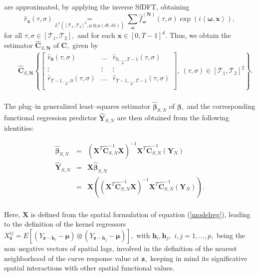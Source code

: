 \documentclass[11pt,a4paper]{article}
\begin{document}
\noindent are approximated, by applying  the inverse SfDFT, obtaining
\begin{equation}\label{Eq1b}
\widehat{r}_{\mathbf{x}}(\tau,\sigma)\underset{L^{2}\left([\mathcal{T}_{1},\mathcal{T}_{2}]^{2},\mu \otimes \mu(dt,ds)\right)}{=}  \sum_{\boldsymbol{\omega}} \widehat{f}_{\boldsymbol{\omega}}^{(\mathbf{N})}(\tau,\sigma) \exp\left(i\left\langle \boldsymbol{\omega}, \mathbf{x}\right\rangle \right),
\end{equation}
\noindent for  all $\tau,\sigma \in [\mathcal{T}_{1},\mathcal{T}_{2}],$ and for each  $\mathbf{x}\in [0,T-1]^{d}.$ Thus, we obtain the estimator  $\widehat{\mathbf{C}}_{S,\mathbf{N}}$ of $\mathbf{C},$  given by
\begin{eqnarray}
&& \widehat{\mathbf{C}}_{S,\mathbf{N}}\left\{\left[\begin{array}{lll}
\widehat{r}_{\mathbf{0}}(\tau ,\sigma ) & \dots & \widehat{r}_{0,\underset{d}{\dots},T-1}(\tau ,\sigma )\\
\vdots &\vdots &\vdots \\
\widehat{r}_{T-1,\underset{d}{\dots},0}(\tau ,\sigma )& \dots & \widehat{r}_{T-1,\underset{d}{\dots},T-1}(\tau ,\sigma )\\
\end{array}\right],\ (\tau,\sigma)\in [\mathcal{T}_{1},\mathcal{T}_{2}]^{2}\right\}.\nonumber\\
\end{eqnarray}

 The plug--in  generalized least--squares estimator $\widehat{\boldsymbol{\beta} }_{S,N}$ of  $\boldsymbol{\beta },$   and  the corresponding functional regression predictor $\widehat{\mathbf{Y}}_{S,N}$  are then obtained from the following identities:


\begin{eqnarray}
\widehat{\boldsymbol{\beta} }_{S,N}&=&
\left(\mathbf{X}^{T}\widehat{\mathbf{C}}^{-1}_{S,N}\mathbf{X}\right)^{-1}\mathbf{X}^{T}
\widehat{\mathbf{C}}^{-1}_{S, N}(\mathbf{Y}_{N})\nonumber\\
\widehat{\mathbf{Y}}_{S,N}&=&\mathbf{X}\widehat{\boldsymbol{\beta} }_{S,N}
\nonumber\\ &=&
\mathbf{X}\left(\left(\mathbf{X}^{T}\widehat{\mathbf{C}}^{-1}_{S,N}\mathbf{X}\right)^{-1}\mathbf{X}^{T}
\widehat{\mathbf{C}}^{-1}_{S, N}(\mathbf{Y}_{N})\right).\nonumber\\
\label{pnsdo}\end{eqnarray}

\noindent  Here, $\mathbf{X}$ is defined from the spatial formulation of equation (\ref{modelreg}), leading to the definition of the kernel regressors $X_{\mathbf{z}}^{ij}=E[(Y_{\mathbf{z}-\mathbf{h}_{i}}-\boldsymbol{\mu})\otimes (Y_{\mathbf{z}-\mathbf{h}_{j}}-\boldsymbol{\mu})],$  with   $\mathbf{h}_{i}, \mathbf{h}_{j},$ $i,j=1,\dots, p,$
being the non--negative vectors of spatial lags, involved in the definition of the   nearest neighborhood of the curve response value at $\mathbf{z},$ keeping in mind its  significative spatial  interactions  with other spatial functional values.
\end{document}
